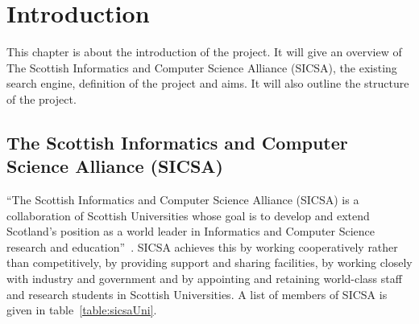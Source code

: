 


\chapter{Introduction}



This chapter is about the introduction of the project. It will give an overview of The Scottish Informatics and Computer Science Alliance (SICSA), 
the existing search engine, definition of the project and aims. It will also outline the structure of the project.

\section{The Scottish Informatics and Computer Science Alliance (SICSA)}\label{sec:whatissicsa}

``The Scottish Informatics and Computer Science Alliance (SICSA) is a collaboration of Scottish Universities whose goal is to develop 
and extend Scotland's position as a world leader in Informatics and Computer Science research and education''~\cite{sicsa}. 
SICSA achieves this by working cooperatively rather than competitively, by providing support and sharing facilities, by working closely 
with industry and government and by appointing and retaining world-class staff and research students in Scottish Universities.
A list of members of SICSA is given in table~\ref{table:sicsaUni}.
\begin{table}
\centering
{} 
\caption{A list of members of SICSA} \label{table:sicsaUni}
\end{table}
